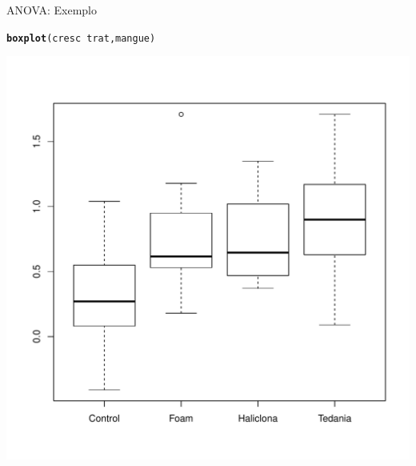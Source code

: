 \documentclass{beamer}\usepackage[]{graphicx}\usepackage[]{color}
\makeatletter
\newcommand{\hlopt}[1]{\textcolor[rgb]{0,0,0}{#1}}%
\newcommand{\hlstd}[1]{\textcolor[rgb]{0.345,0.345,0.345}{#1}}%
\newcommand{\hlkwd}[1]{\textcolor[rgb]{0.737,0.353,0.396}{\textbf{#1}}}%
\newenvironment{kframe}{%
 \def\at@end@of@kframe{}%
 \ifinner\ifhmode%
  \def\at@end@of@kframe{\end{minipage}}%
  \begin{minipage}{\columnwidth}%
 \fi\fi%
 \def\FrameCommand##1{\hskip\@totalleftmargin \hskip-\fboxsep
 \colorbox{shadecolor}{##1}\hskip-\fboxsep
     \hskip-\linewidth \hskip-\@totalleftmargin \hskip\columnwidth}%
 \MakeFramed {\advance\hsize-\width
   \@totalleftmargin\z@ \linewidth\hsize
   \@setminipage}}%
 {\par\unskip\endMakeFramed%
 \at@end@of@kframe}
\newenvironment{knitrout}{}{} %
\renewenvironment{knitrout}{\setlength{\topsep}{0mm}}{}
\makeatother
\begin{document}
\begin{frame}[fragile]{ANOVA: Exemplo}

\begin{knitrout}\tiny
{}\color{fgcolor}\begin{kframe}
\begin{alltt}
\hlkwd{boxplot}\hlstd{(cresc} \hlopt{~} \hlstd{trat,mangue)}
\end{alltt}
\end{kframe}
\includegraphics[width=0.6\linewidth]{figure/unnamed-chunk-4-1} 

\end{knitrout}

\end{frame}
\end{document}
